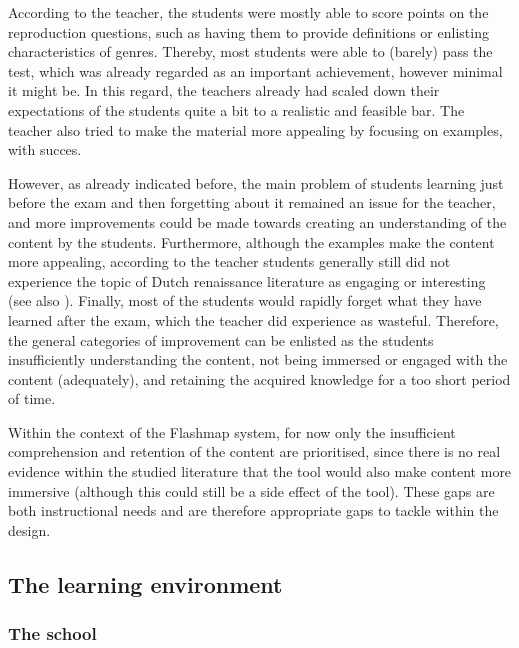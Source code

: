 According to the teacher, the students were mostly able to score points on the reproduction questions, such as having them to provide definitions or enlisting characteristics of genres. Thereby, most students were able to (barely) pass the test, which was already regarded as an important achievement, however minimal it might be. In this regard, the teachers already had scaled down their expectations of the students quite a bit to a realistic and feasible bar. The teacher also tried to make the material more appealing by focusing on examples, with succes.

However, as already indicated before, the main problem of students learning just before the exam and then forgetting about it remained an issue for the teacher, and more improvements could be made towards creating an understanding of the content by the students. Furthermore, although the examples make the content more appealing, according to the teacher students generally still did not experience the topic of Dutch renaissance literature as engaging or interesting (see also ). Finally, most of the students would rapidly forget what they have learned after the exam, which the teacher did experience as wasteful. Therefore, the general categories of improvement can be enlisted as the students insufficiently understanding the content, not being immersed or engaged with the content (adequately), and retaining the acquired knowledge for a too short period of time.

Within the context of the Flashmap system, for now only the insufficient comprehension and retention of the content are prioritised, since there is no real evidence within the studied literature that the tool would also make content more immersive (although this could still be a side effect of the tool). These gaps are both instructional needs and are therefore appropriate gaps to tackle within the design.

\subsection{The learning environment}

\subsubsection{The school}

